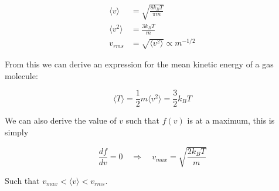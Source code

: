 \documentclass[a4paper]{article}
\begin{document}
\begin{align}
\langle v\rangle&=\sqrt{\frac{8k_BT}{\pi m}}\\[.5em]
\langle v^2\rangle&=\frac{3k_BT}{m}\\[.5em]
v_{rms}&=\sqrt{\langle v^2\rangle}\propto m^{-1/2}
\end{align}

From this we can derive an expression for the mean kinetic energy of a gas molecule:

\begin{equation}
	\langle T\rangle =\frac{1}{2}m\langle v^2\rangle=\frac{3}{2}k_BT
\end{equation}

We can also derive the value of $v$ such that $f(v)$ is at a maximum, this is simply

\begin{equation}
	\frac{df}{dv}=0\quad\Rightarrow\quad v_{max}=\sqrt{\frac{2k_BT}{m}}
\end{equation}

Such that $v_{max} < \langle v\rangle < v_{rms}$.
\end{document}
